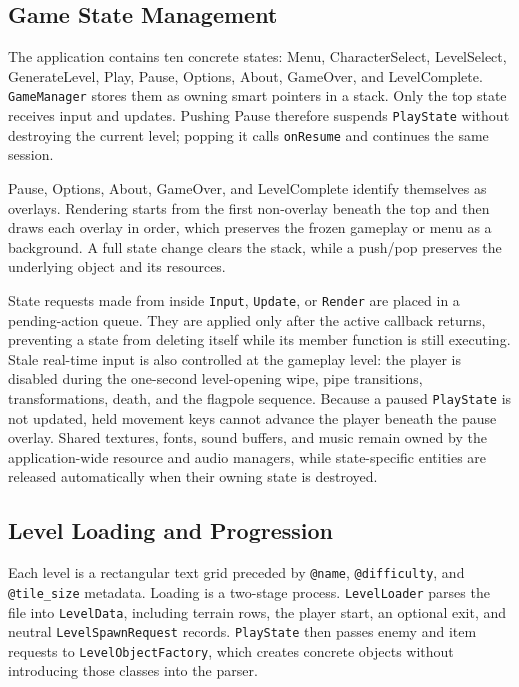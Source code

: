 \documentclass{template}
\begin{document}
\subsection{Game State Management}

The application contains ten concrete states: Menu, CharacterSelect,
LevelSelect, GenerateLevel, Play, Pause, Options, About, GameOver, and
LevelComplete. \texttt{GameManager} stores them as owning smart pointers in a
stack. Only the top state receives
input and updates. Pushing Pause therefore suspends \texttt{PlayState} without
destroying the current level; popping it calls \texttt{onResume} and continues
the same session.

Pause, Options, About, GameOver, and LevelComplete identify themselves as
overlays. Rendering starts from the first non-overlay beneath the top and then
draws each overlay in order, which preserves the frozen gameplay or menu as a
background. A full state change clears the stack, while a push/pop preserves
the underlying object and its resources.

State requests made from inside \texttt{Input}, \texttt{Update}, or
\texttt{Render} are placed in a pending-action queue. They are applied only
after the active callback returns, preventing a state from deleting itself
while its member function is still executing. Stale real-time input is also
controlled at the gameplay level: the player is disabled during the one-second
level-opening wipe, pipe transitions, transformations, death, and the flagpole
sequence. Because a paused \texttt{PlayState} is not updated, held movement
keys cannot advance the player beneath the pause overlay. Shared textures,
fonts, sound buffers, and music remain owned by the application-wide resource
and audio managers, while state-specific entities are released automatically
when their owning state is destroyed.

\subsection{Level Loading and Progression}

Each level is a rectangular text grid preceded by \texttt{@name},
\texttt{@difficulty}, and \texttt{@tile\_size} metadata. Loading is a two-stage
process. \texttt{LevelLoader} parses the file into \texttt{LevelData}, including
terrain rows, the player start, an optional exit, and neutral
\texttt{LevelSpawnRequest} records. \texttt{PlayState} then passes enemy and
item requests to \texttt{LevelObjectFactory}, which creates concrete objects
without introducing those classes into the parser.
\end{document}
